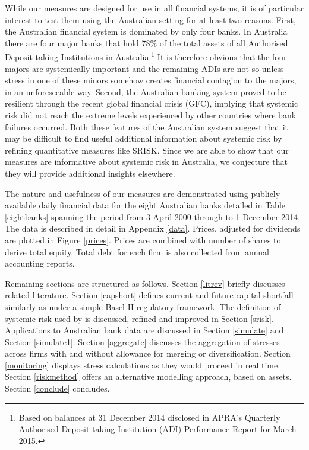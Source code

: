 \documentclass[authoryear]{elsarticle}
\newcommand{\fref}[1]{Figure \ref{#1}}
\newcommand{\sref}[1]{Section \ref{#1}}
\newcommand{\tref}[1]{Table \ref{#1}}
\newcommand{\aref}[1]{Appendix \ref{#1}}
\begin{document}
While our measures are designed for use in all financial systems, it is of particular interest to test them using the Australian setting for at least two reasons. First, the Australian financial system is dominated by only four banks. In Australia there are four major banks that hold 78\% of the total assets of all Authorised Deposit-taking Institutions in  Australia.\footnote{Based on balances at 31 December 2014 disclosed in APRA's Quarterly Authorised Deposit-taking Institution (ADI) Performance Report for March 2015.} It is therefore obvious that the four majors are systemically important and the remaining ADIs are not so unless stress in one of these minors somehow creates financial contagion to the majors, in an unforeseeable way. Second, the Australian banking system proved to be resilient through the recent global financial crisis (GFC), implying that systemic risk did not reach the extreme levels experienced by other countries where bank failures occurred. Both these features of the Australian system suggest that it may be difficult to find useful additional information about systemic risk by refining quantitative measures like SRISK. Since we are able to show that our measures are informative about systemic risk in Australia, we conjecture that they will provide additional insights elsewhere.  

The nature and usefulness of our measures are demonstrated using publicly available daily financial data for the eight Australian banks detailed in \tref{eightbanks} spanning the period from  3 April 2000 through to 1 December 2014.  The data is described in detail in \aref{data}.  Prices, adjusted for dividends are plotted in \fref{prices}.  Prices are combined with number of shares to derive total equity. Total debt for each firm is also collected from annual accounting reports. 

Remaining sections are structured as follows. Section \ref{litrev} briefly discusses related literature. Section \ref{capshort} defines current and future  capital shortfall similarly as \cite{brownlees2015} under a simple Basel II regulatory framework. The definition of systemic risk used by \cite{brownlees2015} is discussed, refined and improved in \sref{srisk}. Applications to Australian bank data are discussed in \sref{simulate} and \sref{simulate1}. Section \ref{aggregate}  discusses the aggregation of  stresses across firms with and without allowance for merging or diversification. Section \ref{monitoring} displays stress calculations as they would proceed in real time.   Section \ref{riskmethod} offers an alternative modelling approach, based on assets.  Section \ref{conclude} concludes.
\end{document}

